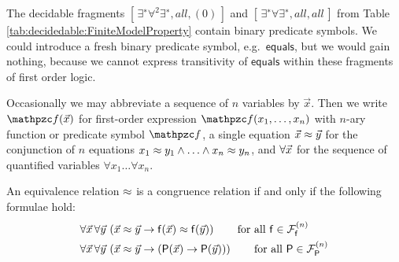\begin{remark}

	The decidable fragments \( [\,\exists^{∗}\forall^2\exists^{∗} , all, (0) \,] \) 
	and \( [\,\exists^{∗}\forall\exists^{∗}, all, all \,] \)
	from Table \vref{tab:decidedable:FiniteModelProperty}
	contain binary predicate symbols. 
	We could introduce a fresh binary predicate symbol, e.g.~\( \mathsf{equals}\),
	but we would gain nothing, because we cannot express transitivity of \( \mathsf{equals} \)
	within these fragments of first order logic.
\end{remark}


\begin{definition}
	Occasionally we may abbreviate a sequence of \( n \) variables by \( \vec{x} \).
	Then we write \( \mcf(\vecn{x}) \)
	for first-order expression \( \mcf(x_1,\ldots,x_n) \)
	with \(n\)-ary function or predicate symbol \( \mcf \),
	a single equation \( \vec{x}\approx\vec{y} \) for
	the conjunction of \( n \) equations
	\( x_1\approx y_1\land\ldots\land x_n\approx y_n \),
	and \( \forall\vec{x} \) for
	the sequence of quantified variables \( \forall x_1\ldots\forall x_n \).
\end{definition}

\begin{definition}
	 An equivalence relation \( \approx \) is a congruence relation if and only if
	the following formulae hold\label{def:congruence:schemata}:
	\begin{align*}
	\forall\vecn{x}\,\forall\vecn{y}\,
	&\left(\vecn{x}\mEQ\vecn{y} \limp \mf(\vecn{x}) \mEQ \mf(\vecn{y}) \right)
	\tag*{for all \( \mf\in\mcFfn \)}
	\\
	\forall\vecn{x}\,\forall\vecn{y}\,
	&\left(\vecn{x}\mEQ\vecn{y} \limp (\mP(\vecn{x}) \limp \mP(\vecn{y}))\right)
	\tag*{for all \( \mP\in\mcFPn \)}
	\end{align*}
\end{definition}

